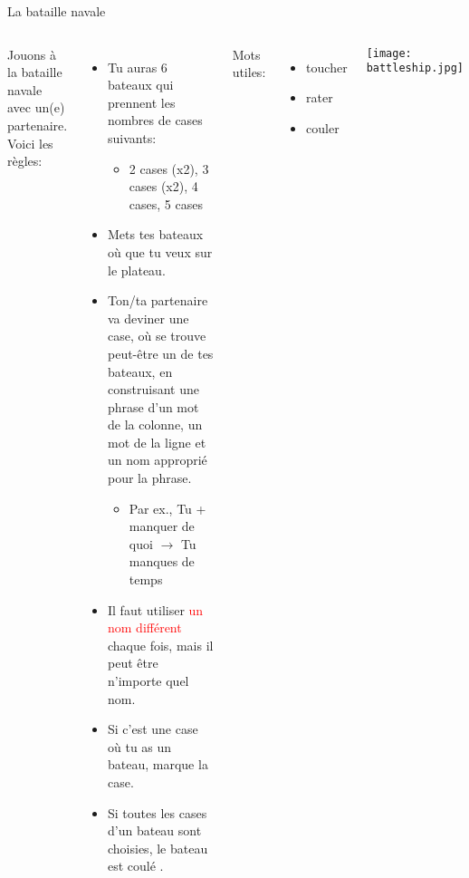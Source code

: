 \begin{frame}{La bataille navale}
  \scriptsize
    \begin{columns}
        Jouons à la bataille navale avec un(e) partenaire.
        Voici les règles:
        \begin{itemize}
          \item Tu auras 6 bateaux qui prennent les nombres de cases  suivants:
          \begin{itemize}
            \scriptsize
            \item 2 cases (x2), 3 cases (x2), 4 cases, 5 cases
          \end{itemize}
          \item Mets tes bateaux où que  tu veux sur le plateau.
          \item Ton/ta partenaire va deviner une case, où se trouve peut-être un de tes bateaux, en construisant une phrase d'un mot de la colonne, un mot de la ligne \alert{et un nom approprié pour la phrase}.
          \begin{itemize}
            \scriptsize
            \item Par ex., Tu + manquer de quoi $\to$ Tu manques de temps
          \end{itemize}
          \item Il faut utiliser \textcolor{red}{un nom différent} chaque fois, mais il peut être n'importe quel nom.
          \item Si c'est une case où tu as un bateau, marque la case.
          \item Si toutes les cases d'un bateau sont choisies, le bateau est coulé .
          \end{itemize}
        \small
        Mots utiles:
        \begin{itemize}
          \item toucher 
          \item rater 
          \item couler 
        \end{itemize}
        \texttt{[image: battleship.jpg]}
    \end{columns}
\end{frame}
